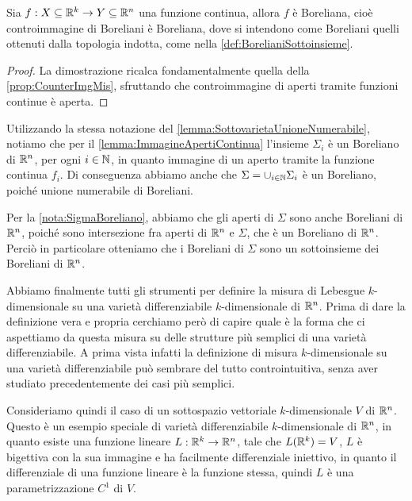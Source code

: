 \begin{lemma}\label{lemma:ContinuaImplicaBoreliana}
	Sia $f:X\subseteq\mathbb R^k\to Y\subseteq\mathbb R^n$ una funzione continua, allora $f$ è Boreliana, cioè controimmagine di Boreliani è Boreliana, dove si intendono come Boreliani quelli ottenuti dalla topologia indotta, come nella \cref{def:BorelianiSottoinsieme}. 
\end{lemma}
\begin{proof}
	La dimostrazione ricalca fondamentalmente quella della \cref{prop:CounterImgMis}, sfruttando che controimmagine di aperti tramite funzioni continue è aperta.
\end{proof}

\begin{remark}\label{nota:SigmaBoreliano}
	Utilizzando la stessa notazione del \cref{lemma:SottovarietaUnioneNumerabile}, notiamo che per il \cref{lemma:ImmagineApertiContinua} l'insieme $\Sigma_i$ è un Boreliano di $\mathbb R^n$, per ogni $i\in\mathbb N$, in quanto immagine di un aperto tramite la funzione continua $f_i$. Di conseguenza abbiamo anche che $\Sigma=\cup_{i\in\mathbb N}\Sigma_i$ è un Boreliano, poiché unione numerabile di Boreliani.  
\end{remark}

\begin{remark}\label{nota:BorelianiSottovarieta}
	Per la \cref{nota:SigmaBoreliano}, abbiamo che gli aperti di $\Sigma$ sono anche Boreliani di $\mathbb R^n$, poiché sono intersezione fra aperti di $\mathbb R^n$ e $\Sigma$, che è un Boreliano di $\mathbb R^n$. Perciò in particolare otteniamo che i Boreliani di $\Sigma$ sono un sottoinsieme dei Boreliani di $\mathbb R^n$.
\end{remark}

Abbiamo finalmente tutti gli strumenti per definire la misura di Lebesgue $k$-dimensionale su una varietà differenziabile $k$-dimensionale di $\mathbb R^n$. Prima di dare la definizione vera e propria cerchiamo però di capire quale è la forma che ci aspettiamo da questa misura su delle strutture più semplici di una varietà differenziabile. A prima vista infatti la definizione di misura $k$-dimensionale su una varietà differenziabile può sembrare del tutto controintuitiva, senza aver studiato precedentemente dei casi più semplici.

Consideriamo quindi il caso di un sottospazio vettoriale $k$-dimensionale $V$ di $\mathbb R^n$. Questo è un esempio speciale di varietà differenziabile $k$-dimensionale di $\mathbb R^n$, in quanto esiste una funzione lineare $L:\mathbb R^k\to \mathbb R^n$, tale che $L(\mathbb R^k)=V$, $L$ è bigettiva con la sua immagine e ha facilmente differenziale iniettivo, in quanto il differenziale di una funzione lineare è la funzione stessa, quindi $L$ è una parametrizzazione $C^1$ di $V$.

